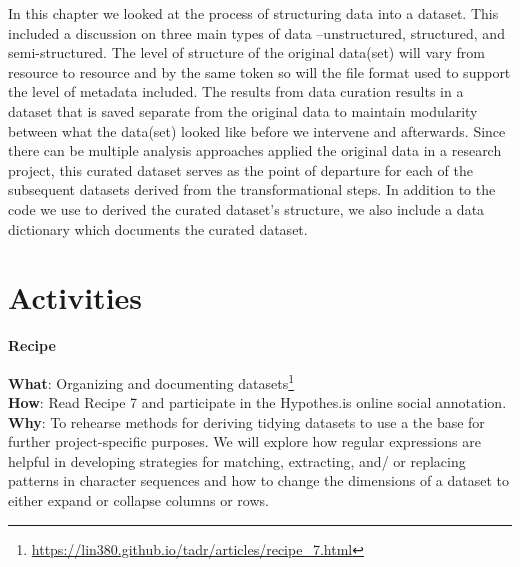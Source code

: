 \documentclass[
  letterpaper,
  DIV=11,
  numbers=noendperiod]{scrreport}
\theoremstyle{definition}
\theoremstyle{remark}
\DeclareRobustCommand{\href}[2]{#2\footnote{\url{#1}}}
\begin{document}
In this chapter we looked at the process of structuring data into a
dataset. This included a discussion on three main types of data
--unstructured, structured, and semi-structured. The level of structure
of the original data(set) will vary from resource to resource and by the
same token so will the file format used to support the level of metadata
included. The results from data curation results in a dataset that is
saved separate from the original data to maintain modularity between
what the data(set) looked like before we intervene and afterwards. Since
there can be multiple analysis approaches applied the original data in a
research project, this curated dataset serves as the point of departure
for each of the subsequent datasets derived from the transformational
steps. In addition to the code we use to derived the curated dataset's
structure, we also include a data dictionary which documents the curated
dataset.

\hypertarget{activities-4}{%
\section*{Activities}\label{activities-4}}


\begin{tcolorbox}[enhanced jigsaw, opacityback=0, bottomrule=.15mm, left=2mm, breakable, colback=white, leftrule=.75mm, toprule=.15mm, rightrule=.15mm, arc=.35mm]

\textbf{ Recipe}

\textbf{What}:
\href{https://lin380.github.io/tadr/articles/recipe_7.html}{Organizing
and documenting datasets}\\
\textbf{How}: Read Recipe 7 and participate in the Hypothes.is online
social annotation.\\
\textbf{Why}: To rehearse methods for deriving tidying datasets to use a
the base for further project-specific purposes. We will explore how
regular expressions are helpful in developing strategies for matching,
extracting, and/ or replacing patterns in character sequences and how to
change the dimensions of a dataset to either expand or collapse columns
or rows.

\end{tcolorbox}
\end{document}
